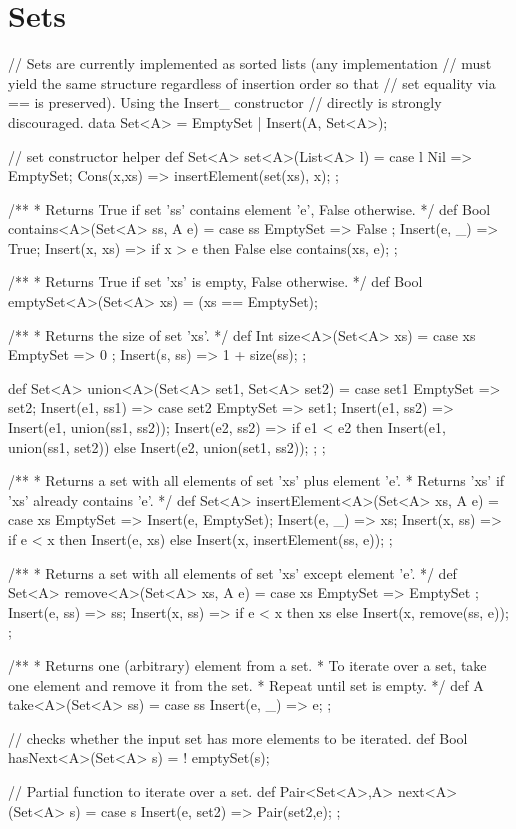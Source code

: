 \section{Sets}

\begin{abscode}
// Sets are currently implemented as sorted lists (any implementation
// must yield the same structure regardless of insertion order so that
// set equality via == is preserved).  Using the Insert_ constructor
// directly is strongly discouraged.
data Set<A> = EmptySet | Insert(A, Set<A>);

// set constructor helper
def Set<A> set<A>(List<A> l) = 
    case l { 
       Nil => EmptySet; 
       Cons(x,xs) => insertElement(set(xs), x);
    };

/**
 * Returns True if set 'ss' contains element 'e', False otherwise.
 */
def Bool contains<A>(Set<A> ss, A e) =
  case ss {
    EmptySet => False ;
    Insert(e, _) => True;
    Insert(x, xs) => if x > e then False else contains(xs, e);
  };
  
/**
 * Returns True if set 'xs' is empty, False  otherwise.
 */
def Bool emptySet<A>(Set<A> xs) = (xs == EmptySet); 

/**
 * Returns the size of set 'xs'.
 */
def Int size<A>(Set<A> xs) = 
   case xs {
      EmptySet => 0 ; 
      Insert(s, ss) => 1 + size(ss); 
   };

def Set<A> union<A>(Set<A> set1, Set<A> set2) =
   case set1 {
      EmptySet => set2;
      Insert(e1, ss1) =>  case set2 {
          EmptySet => set1;
          Insert(e1, ss2) => Insert(e1, union(ss1, ss2));
          Insert(e2, ss2) =>
            if e1 < e2
            then Insert(e1, union(ss1, set2))
            else Insert(e2, union(set1, ss2));
      };
   }; 

/**
 * Returns a set with all elements of set 'xs' plus element 'e'.
 * Returns 'xs' if 'xs' already contains 'e'.
 */
def Set<A> insertElement<A>(Set<A> xs, A e) =
  case xs {
      EmptySet => Insert(e, EmptySet);
      Insert(e, _) => xs;
      Insert(x, ss) => if e < x then Insert(e, xs) else Insert(x, insertElement(ss, e));
  };


/**
 * Returns a set with all elements of set 'xs' except element 'e'.
 */
def Set<A> remove<A>(Set<A> xs, A e) = 
  case xs {
     EmptySet => EmptySet ;
     Insert(e, ss) => ss;
     Insert(x, ss) => if e < x then xs else Insert(x, remove(ss, e));
  };

/**
 * Returns one (arbitrary) element from a set.
 * To iterate over a set, take one element and remove it from the set.
 * Repeat until set is empty.
 */
def A take<A>(Set<A> ss) =
  case ss {
    Insert(e, _) => e;
  };

// checks whether the input set has more elements to be iterated.
def Bool hasNext<A>(Set<A> s) = ! emptySet(s); 

// Partial function to iterate over a set.
def Pair<Set<A>,A> next<A>(Set<A> s) = 
   case s { 
      Insert(e, set2) => Pair(set2,e); 
   };
\end{abscode}

